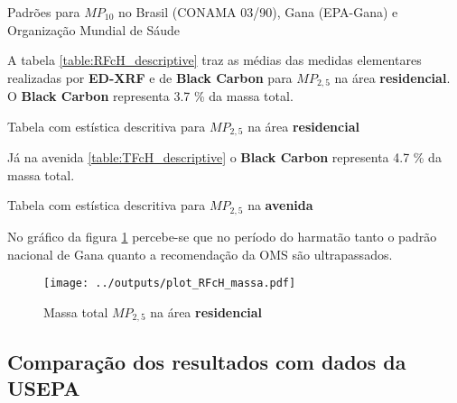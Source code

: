\begin{table}[H]
  \centering
  \begin{scriptsize}
    
  \end{scriptsize}
  \caption{Padrões para $MP_{10}$ no Brasil (CONAMA 03/90), Gana (EPA-Gana) e 
          Organização Mundial de Sáude \label{table:pm10standards}}
\end{table}

A tabela \ref{table:RFcH_descriptive} traz as médias das medidas elementares 
realizadas por \textbf{ED-XRF} e de \textbf{Black Carbon} para $MP_{2,5}$ na área 
\textbf{residencial}.
O \textbf{Black Carbon} representa 3.7 \% da massa total.

\begin{table}[H]
  \centering
  \begin{scriptsize}
    
  \end{scriptsize}
  \caption{Tabela com estística descritiva para $MP_{2,5}$ na área \textbf{residencial}
           \label{table:RFcH_descriptive}}
\end{table}

Já na avenida \ref{table:TFcH_descriptive} o \textbf{Black Carbon} 
representa 4.7 \% da massa total.

\begin{table}[H]
  \centering
  \begin{scriptsize}
    
  \end{scriptsize}
  \caption{Tabela com estística descritiva para $MP_{2,5}$ na \textbf{avenida}
          \label{table:TFcH_descriptive}}
\end{table}

No gráfico da figura \ref{fig:plot_RFcH_massa} percebe-se que no período 
do harmatão tanto o padrão nacional de Gana quanto a recomendação da OMS 
são ultrapassados.

\begin{figure}[H]
\begin{center}
  \texttt{[image: ../outputs/plot\_RFcH\_massa.pdf]}
  \caption{Massa total $MP_{2,5}$ na área \textbf{residencial} \label{fig:plot_RFcH_massa}}
\end{center}
\end{figure}

\subsection{Comparação dos resultados com dados da USEPA}

